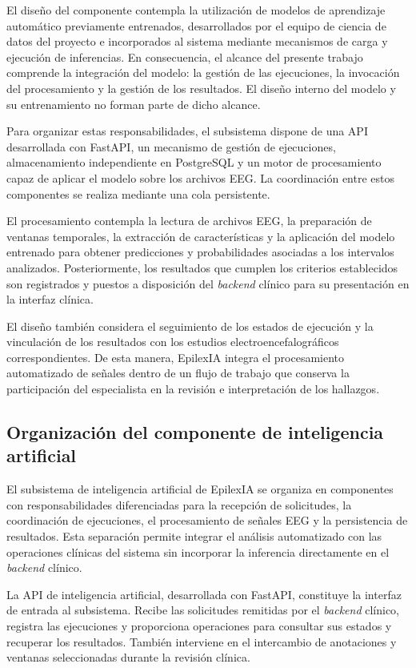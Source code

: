 El diseño del componente contempla la utilización de modelos de aprendizaje automático previamente entrenados, desarrollados por el equipo de ciencia de datos del proyecto e incorporados al sistema mediante mecanismos de carga y ejecución de inferencias.
En consecuencia, el alcance del presente trabajo comprende la integración del modelo: la gestión de las ejecuciones, la invocación del procesamiento y la gestión de los resultados.
El diseño interno del modelo y su entrenamiento no forman parte de dicho alcance.

Para organizar estas responsabilidades, el
subsistema dispone de una API desarrollada
con FastAPI, un mecanismo de gestión de
ejecuciones, almacenamiento independiente
en PostgreSQL y un motor de procesamiento
capaz de aplicar el modelo sobre los archivos
EEG. La coordinación entre estos componentes se realiza mediante una cola persistente.

El procesamiento contempla la lectura de
archivos EEG, la preparación de ventanas
temporales, la extracción de características
y la aplicación del modelo entrenado para
obtener predicciones y probabilidades
asociadas a los intervalos analizados.
Posteriormente, los resultados que cumplen
los criterios establecidos son registrados
y puestos a disposición del \textit{backend} clínico
para su presentación en la interfaz clínica.

El diseño también considera el seguimiento
de los estados de ejecución y la vinculación
de los resultados con los estudios
electroencefalográficos correspondientes.
De esta manera, EpilexIA integra el
procesamiento automatizado de señales
dentro de un flujo de trabajo que conserva
la participación del especialista en la
revisión e interpretación de los hallazgos.

\subsection{Organización del componente de inteligencia artificial}
\label{subsec:organizacion-componente-ia}

El subsistema de inteligencia artificial de EpilexIA se
organiza en componentes con responsabilidades diferenciadas
para la recepción de solicitudes, la coordinación de
ejecuciones, el procesamiento de señales EEG y la
persistencia de resultados. Esta separación permite
integrar el análisis automatizado con las operaciones
clínicas del sistema sin incorporar la inferencia
directamente en el \textit{backend} clínico.

La API de inteligencia artificial, desarrollada con
FastAPI, constituye la interfaz de entrada al subsistema.
Recibe las solicitudes remitidas por el \textit{backend} clínico,
registra las ejecuciones y proporciona operaciones para
consultar sus estados y recuperar los resultados. También
interviene en el intercambio de anotaciones y ventanas
seleccionadas durante la revisión clínica.

